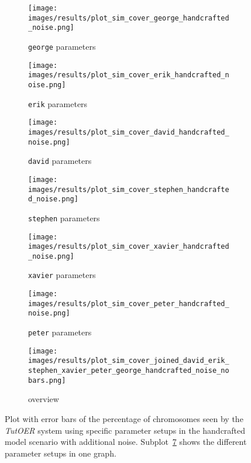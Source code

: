 \begin{figure}[ht]
	\begin{subfigure}{0.48\linewidth}
	\texttt{[image: images/results/plot\_sim\_cover\_george\_handcrafted\_noise.png]}
	\caption{\texttt{george} parameters}
	\label{fig:cover_handcrafted_noise_george}
	\end{subfigure}
	\hfill
	\begin{subfigure}{0.48\linewidth}
	\texttt{[image: images/results/plot\_sim\_cover\_erik\_handcrafted\_noise.png]}
	\caption{\texttt{erik} parameters}
	\label{fig:cover_handcrafted_noise_erik}
	\end{subfigure}
	\begin{subfigure}{0.48\linewidth}
	\texttt{[image: images/results/plot\_sim\_cover\_david\_handcrafted\_noise.png]}
	\caption{\texttt{david} parameters}
	\label{fig:cover_handcrafted_noise_david}
	\end{subfigure}
	\hfill
	\begin{subfigure}{0.48\linewidth}
	\texttt{[image: images/results/plot\_sim\_cover\_stephen\_handcrafted\_noise.png]}
	\caption{\texttt{stephen} parameters}
	\label{fig:cover_handcrafted_noise_stephen}
	\end{subfigure}
	\begin{subfigure}{0.48\linewidth}
	\texttt{[image: images/results/plot\_sim\_cover\_xavier\_handcrafted\_noise.png]}
	\caption{\texttt{xavier} parameters}
	\label{fig:cover_handcrafted_noise_xavier}
	\end{subfigure}
	\hfill
	\begin{subfigure}{0.48\linewidth}
	\texttt{[image: images/results/plot\_sim\_cover\_peter\_handcrafted\_noise.png]}
	\caption{\texttt{peter} parameters}
	\label{fig:cover_handcrafted_noise_peter}
	\end{subfigure}
	\begin{subfigure}{\linewidth}
	\texttt{[image: images/results/plot\_sim\_cover\_joined\_david\_erik\_stephen\_xavier\_peter\_george\_handcrafted\_noise\_nobars.png]}
	\caption{overview}
	\label{fig:cover_handcrafted_noise_overview_group1}
	\end{subfigure}
	\caption{Plot with error bars of the percentage of chromosomes seen by the \emph{TutOER}
	system using specific parameter setups in the handcrafted model scenario
	with additional noise.
	Subplot~\ref{fig:cover_handcrafted_noise_overview_group1} shows the
	different parameter setups in one graph.}
	\label{fig:cover_handcrafted_noise_container_group1}
\end{figure}

